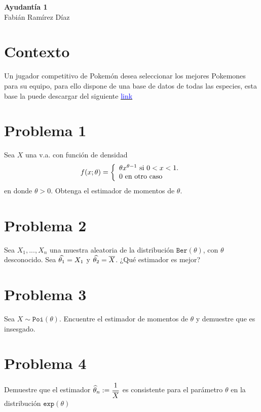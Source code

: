 \begin{center}
    \huge{
    \textbf{
        Ayudantía 1
    }
    }\\
    \normalsize{
        Fabián Ramírez Díaz
    }
\end{center}

\section*{Contexto}
Un jugador competitivo de Pokemón desea seleccionar los mejores Pokemones para su equipo, para ello dispone de una base de datos de todas las especies, esta base la puede descargar del siguiente \href{g}{\textcolor{blue}{link}}
\section*{Problema 1}
Sea $X$ una v.a. con función de densidad $$f(x;\theta) = \left\{ \begin{array}{lcc} 
\theta x^{\theta-1} \text{ si } 0<x<1.\\
0 \text{ en otro caso}
 \end{array} \right.$$ en donde $\theta >0$. Obtenga el estimador de momentos de $\theta$.
\section*{Problema 2}
Sea $X_1, . . . , X_n$ una muestra aleatoria de la distribución
$\texttt{Ber}(\theta)$, con $\theta$ desconocido. Sea $\widehat{\theta_1} = X_1$ y $\widehat{\theta_2} = \overline{X}$. ¿Qué estimador es mejor?
\section*{Problema 3}
Sea $X\sim\texttt{Poi}(\theta)$. Encuentre el estimador de momentos de $\theta$ y demuestre que es insesgado.
\section*{Problema 4}
Demuestre que el estimador $\widehat{\theta}_n := \dfrac{1}{\overline{X}}$ es consistente para el parámetro $\theta$ en la distribución $\texttt{exp}(\theta)$

\vspace{1cm}
